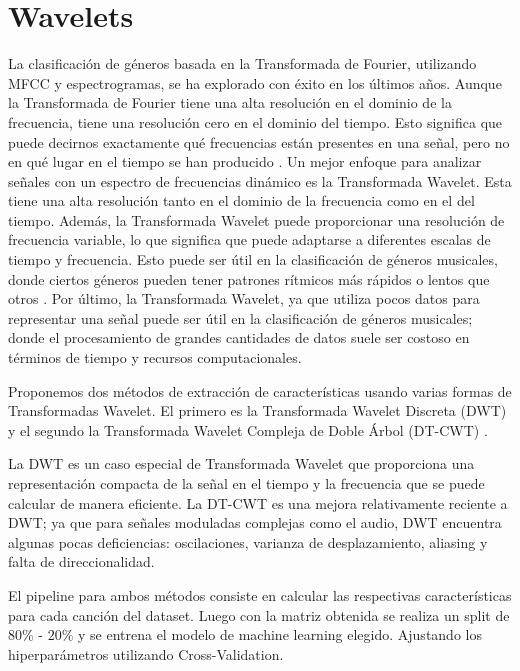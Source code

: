 \documentclass[colorinlistoftodos,twoside,twocolumn,10pt]{article} %
\begin{document}
	\section{Wavelets}

La clasificación de géneros basada en la Transformada de Fourier, utilizando MFCC y espectrogramas, se ha explorado con éxito en los últimos años. Aunque la Transformada de Fourier tiene una alta resolución en el dominio de la frecuencia, tiene una resolución cero en el dominio del tiempo. Esto significa que puede decirnos exactamente qué frecuencias están presentes en una señal, pero no en qué lugar en el tiempo se han producido \cite{wavelet transform in machine learning}. Un mejor enfoque para analizar señales con un espectro de frecuencias dinámico es la Transformada Wavelet. Esta tiene una alta resolución tanto en el dominio de la frecuencia como en el del tiempo. Además, la Transformada Wavelet puede proporcionar una resolución de frecuencia variable, lo que significa que puede adaptarse a diferentes escalas de tiempo y frecuencia. Esto puede ser útil en la clasificación de géneros musicales, donde ciertos géneros pueden tener patrones rítmicos más rápidos o lentos que otros \cite{Musical Genre Classification Of Audio Signals}. Por último, la Transformada Wavelet, ya que utiliza pocos datos para representar una señal puede ser útil en la clasificación de géneros musicales; donde el procesamiento de grandes cantidades de datos suele ser costoso en términos de tiempo y recursos computacionales. 

	Proponemos dos métodos de extracción de características usando varias formas de Transformadas Wavelet. 
    El primero es la Transformada Wavelet Discreta (DWT) \cite{wavelet transform in machine learning} y el segundo la Transformada Wavelet Compleja de Doble Árbol (DT-CWT) \cite{DT-CWT}.
    
    La DWT es un caso especial de Transformada Wavelet que proporciona una representación compacta de la señal en el tiempo y la frecuencia que se puede calcular de manera eficiente\cite{Musical Genre Classification Of Audio Signals}. La DT-CWT es una mejora relativamente reciente a DWT; ya que para señales moduladas complejas como el audio, DWT encuentra algunas pocas deficiencias: oscilaciones, varianza de desplazamiento, aliasing y falta de direccionalidad\cite{Wavelet Transform for Music Genre Classification}. 
    
    El pipeline para ambos métodos consiste en calcular las respectivas características para cada canción del dataset. Luego con la matriz obtenida se realiza un split de $80\%$ - $20\%$ y se entrena el modelo de machine learning elegido. Ajustando los hiperparámetros utilizando Cross-Validation.
\end{document}
